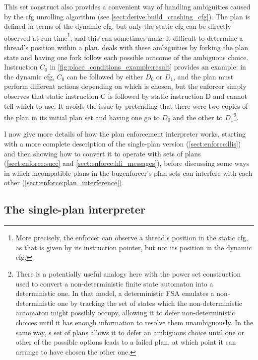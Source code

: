 This set construct also provides a convenient way of handling
ambiguities caused by the \gls{cfg} unrolling algorithm (see
\autoref{sect:derive:build_crashing_cfg}).  The plan is defined in
terms of the \gls{dynamic cfg}, but only the \gls{static cfg} can be
directly observed at run time\footnote{More precisely, the enforcer
  can observe a thread's position in the \gls{static cfg}, as that is
  given by its instruction pointer, but not its position in the
  \gls{dynamic cfg}.}\!\hspace{-.1ex}\!, and this can sometimes make
it difficult to determine a thread's position within a plan.
{\Technique} deals with these ambiguities by forking the plan state
and having one fork follow each possible outcome of the ambiguous
choice.  Instruction $C_0$ in
\autoref{fig:place_conditions_example:result} provides an example: in
the \gls{dynamic cfg}, $C_0$ can be followed by either $D_0$ or $D_1$,
and the plan must perform different actions depending on which is
chosen, but the enforcer simply observes that static instruction C is
followed by static instruction D and cannot tell which to use.  It
avoids the issue by pretending that there were two copies of the plan
in its initial plan set and having one go to $D_0$ and the other to
$D_1$\footnote{There is a potentially useful analogy here with the
  power set construction used to convert a non-deterministic finite
  state automaton into a deterministic one.  In that model, a
  deterministic FSA emulates a non-deterministic one by tracking the
  set of states which the non-deterministic automaton might possibly
  occupy, allowing it to defer non-deterministic choices until it has
  enough information to resolve them unambiguously.  In the same way,
  {\technique}s set of plans allows it to defer an ambiguous choice
  until one or other of the possible options leads to a failed plan,
  at which point it can arrange to have chosen the other
  one.}\!\hspace{-.1ex}\!.

I now give more details of how the plan enforcement interpreter works,
starting with a more complete description of the single-plan version
(\autoref{sect:enforce:llis}) and then showing how to convert it to
operate with sets of plans (\autoref{sect:enforce:succ} and
\autoref{sect:enforce:hli_messages}), before discussing some ways in
which incompatible plans in the \gls{bugenforcer}'s plan sets can
interfere with each other (\autoref{sect:enforce:plan_interference}).

\subsection{The single-plan interpreter}
\label{sect:enforce:llis}

